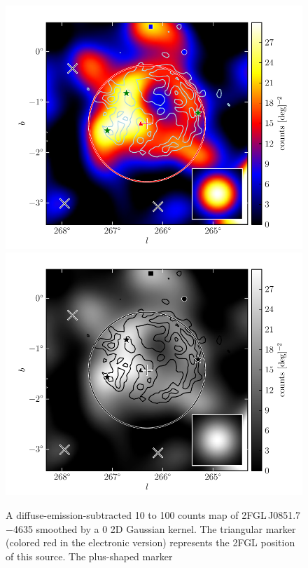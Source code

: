 \begin{figure}
    \ifcolorfigure
      \includegraphics{source_plots/source_Vela_Jr_color.pdf}
    \else
      \includegraphics{source_plots/source_Vela_Jr_bw.pdf}
    \fi
  \caption{A diffuse-emission-subtracted 10 \gev to 100 \gev counts map of
  2FGL\,J0851.7$-$4635 smoothed by a 0 2D Gaussian
  kernel. The triangular marker (colored red in the electronic version)
  represents the 2FGL position of this source.  The plus-shaped marker
}
\end{figure}
